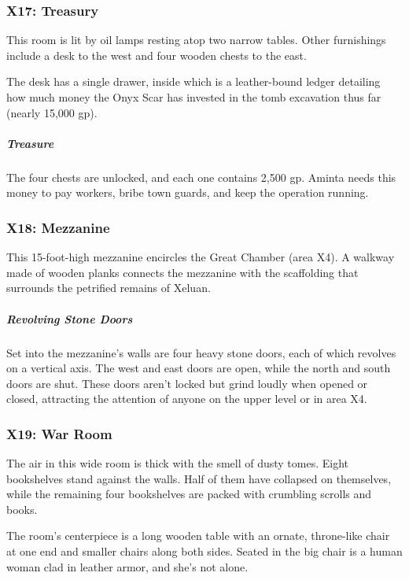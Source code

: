 \documentclass[10pt,a4paper,twoside,bg=print,twocolumn,openany,nodeprecatedcode]{dndbook}
\begin{document}
\subsubsection{X17: Treasury}
\begin{DndReadAloud}{}
This room is lit by oil lamps resting atop two narrow tables. Other furnishings include a desk to the west and four wooden chests to the east.

\end{DndReadAloud}

The desk has a single drawer, inside which is a leather-bound ledger detailing how much money the Onyx Scar has invested in the tomb excavation thus far (nearly 15,000 gp).

\subparagraph{Treasure}
The four chests are unlocked, and each one contains 2,500 gp. Aminta needs this money to pay workers, bribe town guards, and keep the operation running.

\subsubsection{X18: Mezzanine}
This 15-foot-high mezzanine encircles the Great Chamber (area X4). A walkway made of wooden planks connects the mezzanine with the scaffolding that surrounds the petrified remains of Xeluan.

\subparagraph{Revolving Stone Doors}
Set into the mezzanine's walls are four heavy stone doors, each of which revolves on a vertical axis. The west and east doors are open, while the north and south doors are shut. These doors aren't locked but grind loudly when opened or closed, attracting the attention of anyone on the upper level or in area X4.

\subsubsection{X19: War Room}
\begin{DndReadAloud}{}
The air in this wide room is thick with the smell of dusty tomes. Eight bookshelves stand against the walls. Half of them have collapsed on themselves, while the remaining four bookshelves are packed with crumbling scrolls and books.

The room's centerpiece is a long wooden table with an ornate, throne-like chair at one end and smaller chairs along both sides. Seated in the big chair is a human woman clad in leather armor, and she's not alone.

\end{DndReadAloud}
\end{document}
